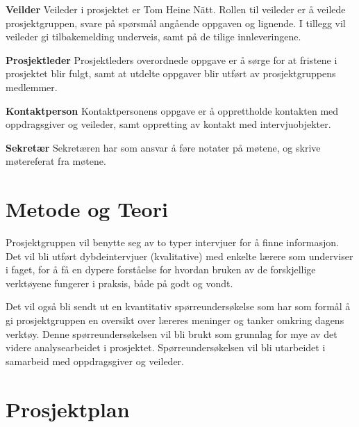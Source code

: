 \documentclass[norsk,a4paper,12pt]{article}
\begin{document}
\noindent\textbf{Veilder}\newline
Veileder i prosjektet er Tom Heine Nätt. Rollen til veileder er å veilede prosjektgruppen, svare på spørsmål angående oppgaven og lignende. I tillegg vil veileder gi tilbakemelding underveis, samt på de tilige innleveringene.
\newline

\noindent\textbf{Prosjektleder}\newline
Prosjektleders overordnede oppgave er å sørge for at fristene i prosjektet blir fulgt, samt at utdelte oppgaver blir utført av prosjektgruppens medlemmer. 
\newline

\noindent\textbf{Kontaktperson}\newline
Kontaktpersonens oppgave er å opprettholde kontakten med oppdragsgiver og veileder, samt oppretting av  kontakt med intervjuobjekter.
\newline

\noindent\textbf{Sekretær}\newline
Sekretæren har som ansvar å føre notater på møtene, og skrive møtereferat fra møtene.


\section{Metode og Teori}

Prosjektgruppen vil benytte seg av to typer intervjuer for å finne informasjon. 
Det vil bli utført dybdeintervjuer (kvalitative) med enkelte lærere som underviser i faget, for å få en dypere forståelse for hvordan bruken av de forskjellige verktøyene fungerer i praksis, både på godt og vondt.
\newline

Det vil også bli sendt ut en kvantitativ spørreundersøkelse som har som formål å gi prosjektgruppen en oversikt over læreres meninger og tanker omkring dagens verktøy. Denne spørreundersøkelsen vil bli brukt som grunnlag for mye av det videre analysearbeidet i prosjektet. Spørreundersøkelsen vil bli utarbeidet i samarbeid med oppdragsgiver og veileder.

\newpage

\section{Prosjektplan}
\end{document}
